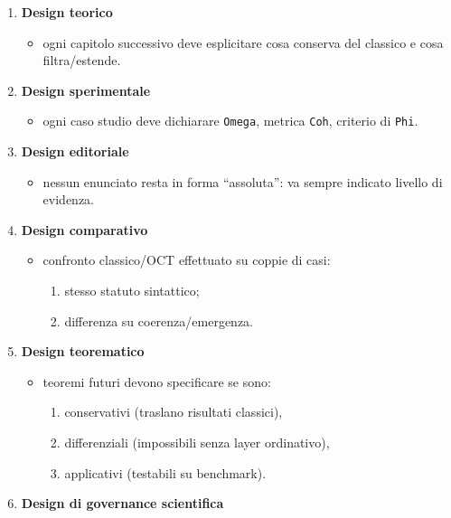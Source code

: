 \begin{enumerate}
\def\labelenumi{\arabic{enumi}.}
\item
  \textbf{Design teorico}

  \begin{itemize}
  \tightlist
  \item
    ogni capitolo successivo deve esplicitare cosa conserva del classico e cosa filtra/estende.
  \end{itemize}
\item
  \textbf{Design sperimentale}

  \begin{itemize}
  \tightlist
  \item
    ogni caso studio deve dichiarare \texttt{Omega}, metrica \texttt{Coh}, criterio di \texttt{Phi}.
  \end{itemize}
\item
  \textbf{Design editoriale}

  \begin{itemize}
  \tightlist
  \item
    nessun enunciato resta in forma ``assoluta'': va sempre indicato livello di evidenza.
  \end{itemize}
\item
  \textbf{Design comparativo}

  \begin{itemize}
  \tightlist
  \item
    confronto classico/OCT effettuato su coppie di casi:

    \begin{enumerate}
    \def\labelenumii{\arabic{enumii}.}
    \tightlist
    \item
      stesso statuto sintattico;
    \item
      differenza su coerenza/emergenza.
    \end{enumerate}
  \end{itemize}
\item
  \textbf{Design teorematico}

  \begin{itemize}
  \tightlist
  \item
    teoremi futuri devono specificare se sono:

    \begin{enumerate}
    \def\labelenumii{\arabic{enumii}.}
    \tightlist
    \item
      conservativi (traslano risultati classici),
    \item
      differenziali (impossibili senza layer ordinativo),
    \item
      applicativi (testabili su benchmark).
    \end{enumerate}
  \end{itemize}
\item
  \textbf{Design di governance scientifica}


\end{enumerate}
